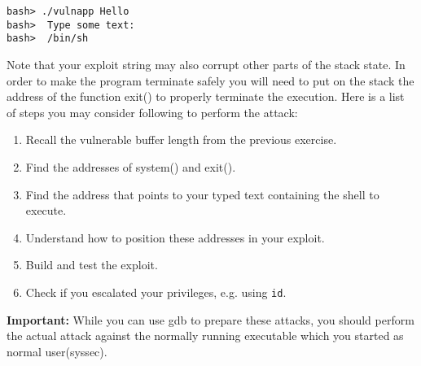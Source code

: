 \documentclass[a4paper,11pt]{article}
\begin{document}
\begin{verbatim}
bash> ./vulnapp Hello
bash>  Type some text:
bash>  /bin/sh
\end{verbatim}

Note that your exploit string may also corrupt other parts of the
stack state. In order to make the program terminate safely you will
need to put on the stack the address of the function exit() to
properly terminate the execution. Here is a list of steps you may
consider following to perform the attack:

\begin{enumerate}
\item Recall the vulnerable buffer length from the previous exercise.
  \item Find the addresses of system() and exit().
  \item Find the address that points to your typed text containing the shell to
  execute.
  \item Understand how to position these addresses in your exploit.
  \item Build and test the exploit.
  \item Check if you escalated your privileges, e.g. using \texttt{id}.
\end{enumerate}

\textbf{Important:} While you can use gdb to prepare these attacks, you should
perform the actual attack against the normally running executable which you
started as normal user(syssec).
\end{document}
